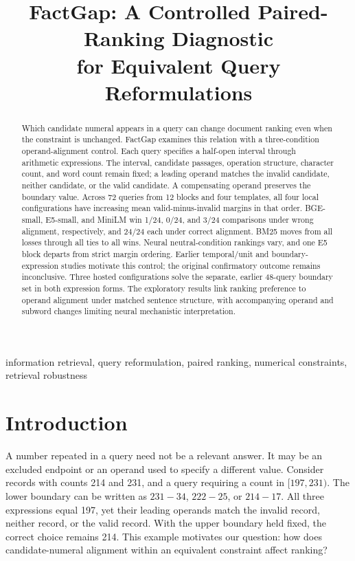 \documentclass[conference,letterpaper]{IEEEtran}
\title{FactGap: A Controlled Paired-Ranking Diagnostic\\for Equivalent Query Reformulations}
\author{
\IEEEauthorblockN{Haoting Qiu}
\IEEEauthorblockA{Independent Researcher\\United States\\\texttt{qiu.haot@northeastern.edu}}
\and
\IEEEauthorblockN{Qibai Chen}
\IEEEauthorblockA{Independent Researcher\\United States\\\texttt{qibaic@alumni.cmu.edu}}
}
\begin{document}
\maketitle
\thispagestyle{empty}
\pagestyle{empty}


\begin{abstract}
Which candidate numeral appears in a query can change document ranking even when the constraint is unchanged. FactGap examines this relation with a three-condition operand-alignment control. Each query specifies a half-open interval through arithmetic expressions. The interval, candidate passages, operation structure, character count, and word count remain fixed; a leading operand matches the invalid candidate, neither candidate, or the valid candidate. A compensating operand preserves the boundary value. Across 72 queries from 12 blocks and four templates, all four local configurations have increasing mean valid-minus-invalid margins in that order. BGE-small, E5-small, and MiniLM win 1/24, 0/24, and 3/24 comparisons under wrong alignment, respectively, and 24/24 each under correct alignment. BM25 moves from all losses through all ties to all wins. Neural neutral-condition rankings vary, and one E5 block departs from strict margin ordering. Earlier temporal/unit and boundary-expression studies motivate this control; the original confirmatory outcome remains inconclusive. Three hosted configurations solve the separate, earlier 48-query boundary set in both expression forms. The exploratory results link ranking preference to operand alignment under matched sentence structure, with accompanying operand and subword changes limiting neural mechanistic interpretation.
\end{abstract}
\begin{IEEEkeywords}
information retrieval, query reformulation, paired ranking, numerical constraints, retrieval robustness
\end{IEEEkeywords}


\section{Introduction}
A number repeated in a query need not be a relevant answer. It may be an excluded endpoint or an operand used to specify a different value. Consider records with counts 214 and 231, and a query requiring a count in $[197,231)$. The lower boundary can be written as $231-34$, $222-25$, or $214-17$. All three expressions equal 197, yet their leading operands match the invalid record, neither record, or the valid record. With the upper boundary held fixed, the correct choice remains 214. This example motivates our question: how does candidate-numeral alignment within an equivalent constraint affect ranking?
\end{document}

